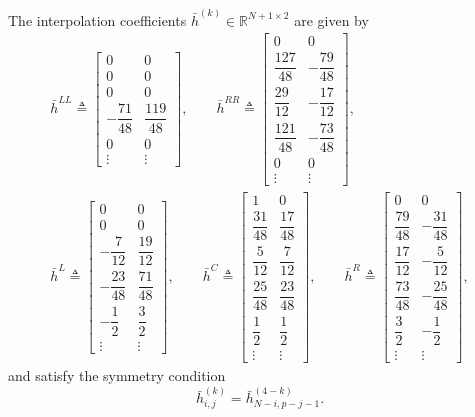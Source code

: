 \documentclass{scrartcl}
\begin{document}
\begin{definition} \label{def:weno:interp}
The interpolation coefficients $\bar{h}^{(k)} \in \mathbb{R}^{N + 1 \times 2}$
are given by
\begin{gather}
\bar{h}^{LL} \triangleq
\begin{bmatrix}
0 & 0 \\[1em]
0 & 0 \\[1em]
0 & 0 \\[1em]
-\dfrac{71}{48} & \dfrac{119}{48} \\[1em]
0 & 0 \\[1em]
\vdots & \vdots
\end{bmatrix},
\qquad
\bar{h}^{RR} \triangleq
\begin{bmatrix}
0 & 0 \\[1em]
\dfrac{127}{48} & -\dfrac{79}{48} \\[1em]
\dfrac{29}{12} & -\dfrac{17}{12} \\[1em]
\dfrac{121}{48} & -\dfrac{73}{48} \\[1em]
0 & 0 \\[1em]
\vdots & \vdots
\end{bmatrix}, \\
\bar{h}^L \triangleq
\begin{bmatrix}
0 & 0 \\[1em]
0 & 0 \\[1em]
-\dfrac{7}{12} & \dfrac{19}{12} \\[1em]
-\dfrac{23}{48} & \dfrac{71}{48} \\[1em]
-\dfrac{1}{2} & \dfrac{3}{2} \\[1em]
\vdots & \vdots
\end{bmatrix},
\qquad
\bar{h}^C \triangleq
\begin{bmatrix}
1 & 0 \\[1em]
\dfrac{31}{48} & \dfrac{17}{48} \\[1em]
\dfrac{5}{12} & \dfrac{7}{12} \\[1em]
\dfrac{25}{48} & \dfrac{23}{48} \\[1em]
\dfrac{1}{2} & \dfrac{1}{2} \\[1em]
\vdots & \vdots
\end{bmatrix},
\qquad
\bar{h}^R \triangleq
\begin{bmatrix}
0 & 0 \\[1em]
\dfrac{79}{48} & -\dfrac{31}{48} \\[1em]
\dfrac{17}{12} & -\dfrac{5}{12} \\[1em]
\dfrac{73}{48} & -\dfrac{25}{48} \\[1em]
\dfrac{3}{2} & -\dfrac{1}{2} \\[1em]
\vdots & \vdots
\end{bmatrix},
\end{gather}
and satisfy the symmetry condition
\[
\bar{h}^{(k)}_{i, j} = \bar{h}^{(4 - k)}_{N - i, p - j - 1}.
\]
\end{definition}
\end{document}
